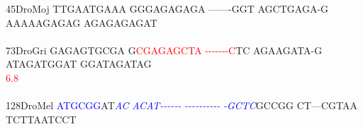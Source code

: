 \documentclass[11pt,twoside,reqno,a4paper]{article}
\begin{document}
{45\hspace*{2\charwidth}DroMoj	TTGAATGAAA	GGGAGAGAGA	-------GGT	AGCTGAGA-G	AAAAAGAGAG	AGAGAGAGAT	\\
\hspace*{4\charwidth}\hspace*{7\charwidth}\hspace*{1\charwidth}\hspace*{1\charwidth}\hspace*{1\charwidth}\hspace*{1\charwidth}\hspace*{1\charwidth}\hspace*{1\charwidth}\\
73\hspace*{2\charwidth}DroGri	GAGAGTGCGA	G\textcolor{Red}{C}\textcolor{Red}{G}\textcolor{Red}{A}\textcolor{Red}{G}\textcolor{Red}{A}\textcolor{Red}{G}\textcolor{Red}{C}\textcolor{Red}{T}\textcolor{Red}{A}	\textcolor{Red}{-}\textcolor{Red}{-}\textcolor{Red}{-}\textcolor{Red}{-}\textcolor{Red}{-}\textcolor{Red}{-}\textcolor{Red}{-}\textcolor{Red}{C}TC	AGAAGATA-G	ATAGATGGAT	GGATAGATAG	\\
\hspace*{4\charwidth}\hspace*{7\charwidth}\hspace*{1\charwidth}\hspace*{11\charwidth}\textcolor{Red}{6.8}\hspace*{1\charwidth}\hspace*{1\charwidth}\hspace*{1\charwidth}\hspace*{1\charwidth}\hspace*{1\charwidth}\\
\\
128\hspace*{1\charwidth}DroMel	\textcolor{Blue}{A}\textcolor{Blue}{T}\textcolor{Blue}{G}\textcolor{Blue}{C}\textcolor{Blue}{G}\textcolor{Blue}{G}AT\textit{\textcolor{Blue}{A}}\textit{\textcolor{Blue}{C}}	\textit{\textcolor{Blue}{A}}\textit{\textcolor{Blue}{C}}\textit{\textcolor{Blue}{A}}\textit{\textcolor{Blue}{T}}\textit{\textcolor{Blue}{-}}\textit{\textcolor{Blue}{-}}\textit{\textcolor{Blue}{-}}\textit{\textcolor{Blue}{-}}\textit{\textcolor{Blue}{-}}\textit{\textcolor{Blue}{-}}	\textit{\textcolor{Blue}{-}}\textit{\textcolor{Blue}{-}}\textit{\textcolor{Blue}{-}}\textit{\textcolor{Blue}{-}}\textit{\textcolor{Blue}{-}}\textit{\textcolor{Blue}{-}}\textit{\textcolor{Blue}{-}}\textit{\textcolor{Blue}{-}}\textit{\textcolor{Blue}{-}}\textit{\textcolor{Blue}{-}}	\textit{\textcolor{Blue}{-}}\textit{\textcolor{Blue}{G}}\textit{\textcolor{Blue}{C}}\textit{\textcolor{Blue}{T}}\textit{\textcolor{Blue}{C}}GCCGG	CT---CGTAA	TCTTAATCCT	\\
}
\end{document}
